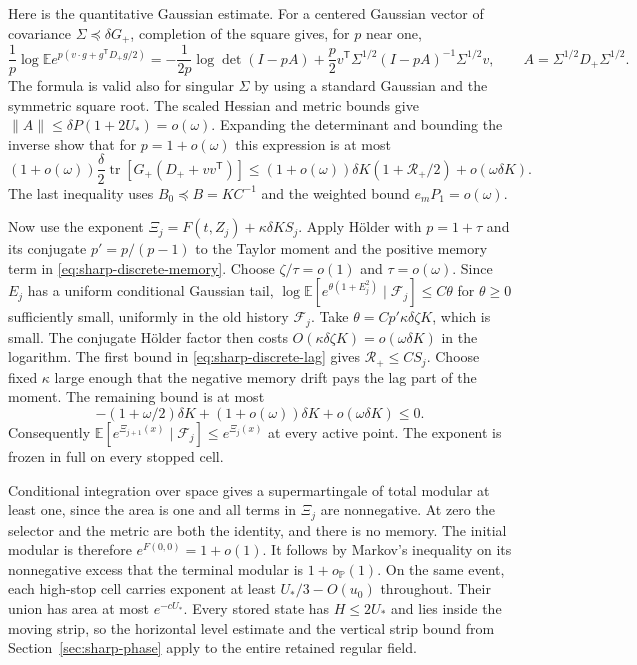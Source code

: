 \documentclass[11pt]{article}
\newcommand{\1}{\mathbf{1}}
\numberwithin{equation}{section}
\newcommand{\E}{\mathbb E}
\newcommand{\tr}{\operatorname{tr}}
\begin{document}
Here is the quantitative Gaussian estimate. For a centered
Gaussian vector of covariance \(\Sigma\preceq\delta G_+\),
completion of the square gives, for \(p\) near one,
\[
 \frac1p\log \E e^{p(v\cdot g+g^{\mathsf T}D_+g/2)}
 =
 -\frac1{2p}\log\det(I-pA)
 +\frac p2 v^{\mathsf T}\Sigma^{1/2}
                  (I-pA)^{-1}\Sigma^{1/2}v,\qquad
 A=\Sigma^{1/2}D_+\Sigma^{1/2}.
\]
The formula is valid also for singular \(\Sigma\) by using
a standard Gaussian and the symmetric square root.
The scaled Hessian and metric bounds give
\(\|A\|\le \delta P(1+2U_*)=o(\omega)\).
Expanding the determinant and bounding the inverse show
that for \(p=1+o(\omega)\) this expression is at most
\[
 (1+o(\omega))\frac\delta2
      \tr[G_+(D_++vv^{\mathsf T})]
 \le (1+o(\omega))\delta K(1+\mathcal R_+/2)
                  +o(\omega\delta K).
\]
The last inequality uses \(B_0\preceq B=KC^{-1}\) and the
weighted bound \(e_mP_1=o(\omega)\).

Now use the exponent \(\Xi_j=F(t,Z_j)+\kappa\delta KS_j\).
Apply Hölder with \(p=1+\tau\) and its conjugate \(p'=p/(p-1)\)
to the Taylor moment and the positive memory term in
\eqref{eq:sharp-discrete-memory}. Choose
\(\zeta/\tau=o(1)\) and \(\tau=o(\omega)\).
Since \(E_j\) has a uniform conditional Gaussian tail,
\(\log \E[e^{\theta(1+E_j^2)}\mid\mathcal F_j]\le C\theta\)
for \(\theta\ge0\) sufficiently small, uniformly in the
old history \(\mathcal F_j\).
Take \(\theta=Cp'\kappa\delta\zeta K\), which is small.
The conjugate Hölder factor then costs
\(O(\kappa\delta\zeta K)=o(\omega\delta K)\) in the
logarithm. The first bound in \eqref{eq:sharp-discrete-lag}
gives \(\mathcal R_+\le C S_j\).
Choose fixed \(\kappa\) large enough that the negative
memory drift pays the lag part of the moment. The remaining
bound is at most
\[
 -(1+\omega/2)\delta K+(1+o(\omega))\delta K
                               +o(\omega\delta K)\le0.
\]
Consequently \(\E[e^{\Xi_{j+1}(x)}\mid\mathcal F_j]\le
e^{\Xi_j(x)}\) at every active point. The exponent is
frozen in full on every stopped cell.

Conditional integration over space gives a supermartingale
of total modular at least one, since the area is one and
all terms in \(\Xi_j\) are nonnegative. At zero the selector
and the metric are both the identity, and there is no
memory. The initial modular is therefore \(e^{F(0,0)}=1+o(1)\).
It follows by Markov's inequality on its nonnegative excess
that the terminal modular is \(1+o_{\mathbb P}(1)\).
On the same event, each high-stop cell carries exponent
at least \(U_*/3-O(u_0)\) throughout. Their union has area
at most \(e^{-cU_*}\). Every stored state has \(H\le2U_*\)
and lies inside the moving strip, so the horizontal level
estimate and the vertical strip bound from
Section~\ref{sec:sharp-phase} apply to the entire retained
regular field.
\end{document}
